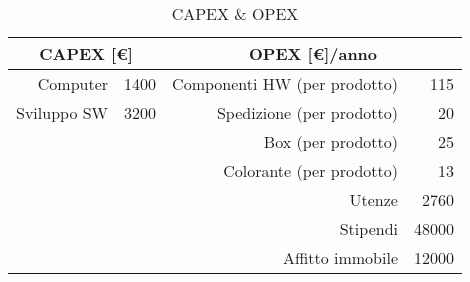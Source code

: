 \begin{table}[!h]
\centering
\begin{tabular}{r@{\qquad}l|r@{\qquad}r}
 \multicolumn{2}{c}{CAPEX [\euro]}
& \multicolumn{2}{|c}{OPEX [\euro]/anno}
\\          
\hline
 Computer    & 1400  & Componenti HW (per prodotto) & 115 \\
 Sviluppo SW & 3200  & Spedizione    (per prodotto) & 20  \\ 
             &       & Box           (per prodotto) & 25  \\
             &       & Colorante     (per prodotto) & 13  \\
             &       & Utenze           & 2760  \\
             &       & Stipendi         & 48000  \\
             &       & Affitto immobile & 12000  \\
\end{tabular}
\caption{CAPEX \& OPEX}
\label{tab:pex}
\end{table}
